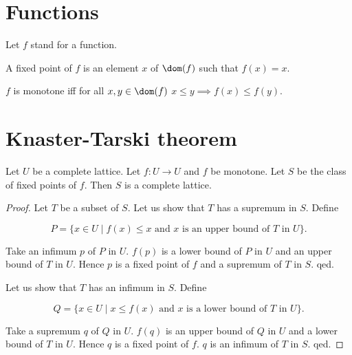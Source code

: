 \documentclass{article}
\begin{document}
  \section{Functions}

  \begin{forthel}
    Let $f$ stand for a function.

    \begin{definition}
      A fixed point of $f$ is an element $x$ of $\dom(f)$ such that $f(x) = x$.
    \end{definition}

    \begin{definition}
      $f$ is monotone iff for all $x,y \in \dom(f)$
      $x \leq y \implies f(x) \leq f(y)$.
    \end{definition}
  \end{forthel}

  \section{Knaster-Tarski theorem}

  \begin{forthel}
    \begin{theorem}[KnasterTarski]
      Let $U$ be a complete lattice.
      Let $f:U \rightarrow U$ and $f$ be monotone.
      Let $S$ be the class of fixed points of $f$.
      Then $S$ is a complete lattice.
    \end{theorem}
    \begin{proof}
      Let $T$ be a subset of $S$.
      Let us show that $T$ has a supremum in $S$.  Define

        \[ P = \{x \in U \mid \text{$f(x) \leq x$ and $x$ is an upper bound of
        $T$ in $U$} \}. \]

        Take an infimum $p$ of $P$ in $U$.
        $f(p)$ is a lower bound of $P$ in $U$ and an upper bound of $T$ in $U$.
        Hence $p$ is a fixed point of $f$ and a supremum of $T$ in $S$.
      qed.

      Let us show that $T$ has an infimum in $S$. Define

        \[ Q = \{x \in U \mid \text{$x \leq f(x)$ and $x$ is a lower bound of
        $T$ in $U$} \}. \]

        Take a supremum $q$ of $Q$ in $U$.
        $f(q)$ is an upper bound of $Q$ in $U$ and a lower bound of $T$ in $U$.
        Hence $q$ is a fixed point of $f$.
        $q$ is an infimum of $T$ in $S$.
      qed.
    \end{proof}
  \end{forthel}
\end{document}
